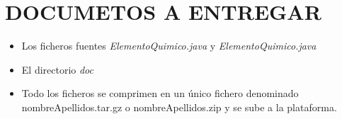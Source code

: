 \documentclass[addpoints]{exam}
\begin{document}
\section{DOCUMETOS A ENTREGAR}
\begin{itemize}
\item Los ficheros fuentes \emph{ElementoQuimico.java} y \emph{ElementoQuimico.java}
\item El directorio \emph{doc} 
\item Todo los ficheros se comprimen en un único fichero denominado nombreApellidos.tar.gz o nombreApellidos.zip y se sube a la plataforma.  
\end{itemize}
\end{document}
